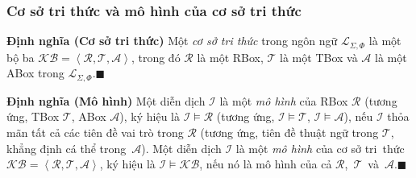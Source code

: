 \documentclass[notheorems,xcolor=dvipsnames]{beamer}
\newcommand{\mL}		{\mathcal{L}}
\newcommand{\mA}		{\mathcal{A}}
\newcommand{\mT}		{\mathcal{T}}
\newcommand{\mR}		{\mathcal{R}}
\newcommand{\mI}		{\mathcal{I}}
\newcommand{\KB}		{\mathcal{KB}}
\newcommand{\mLSP}		{\mL_{\Sigma,\Phi}}
\newcommand{\myend}		{\mbox{}\hfill\mbox{{\tiny$\!\blacksquare$}}}
\newcommand{\tuple}[1]	{\left\langle#1\right\rangle\!}
\begin{document}
\begin{frame}\frametitle{\bf Cơ sở tri thức và mô hình của cơ sở tri thức}
	\begin{block}{\bf Định nghĩa (Cơ sở tri thức)}
		Một {\em cơ sở tri thức} trong ngôn ngữ $\mLSP$ là một bộ ba \mbox{$\KB = \tuple{\mR, \mT, \mA}$}, trong đó $\mR$ là một RBox, $\mT$ là một TBox và $\mA$ là một ABox trong $\mLSP$.\myend
	\end{block}
	
	\begin{block}{\bf Định nghĩa (Mô hình)}
		Một diễn dịch $\mI$ là một {\em mô hình} của RBox $\mR$ (tương ứng, TBox $\mT$, ABox $\mA$), ký hiệu là $\mI \models \mR$ (tương ứng, $\mI \models \mT$, $\mI \models \mA$), nếu $\mI$ thỏa mãn tất cả các tiên đề vai trò trong $\mR$ (tương ứng, tiên đề thuật ngữ trong $\mT$, khẳng định cá thể trong~$\mA$).
		Một diễn dịch $\mI$ là một {\em mô hình} của cơ sở tri~thức $\KB=\tuple{\mR,\mT, \mA}$, ký hiệu là $\mI \models \KB$, nếu nó là mô hình của cả $\mR$,~$\mT$~và~$\mA$.\myend
	\end{block}
\end{frame}

%		
%		
%		
%		
\end{document}
